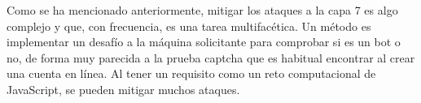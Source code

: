 \documentclass[14pt]{book}
\begin{document}
Como se ha mencionado anteriormente, mitigar los ataques a la capa 7 es algo complejo y que, con frecuencia, es una tarea multifacética. Un método es implementar un desafío a la máquina solicitante para comprobar si es un bot o no, de forma muy parecida a la prueba captcha que es habitual encontrar al crear una cuenta en línea. Al tener un requisito como un reto computacional de JavaScript, se pueden mitigar muchos ataques.
\end{document}
